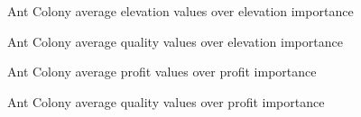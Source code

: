 \begin{figure}[H]
	\centering
	
	\caption{Ant Colony average elevation values over elevation importance}
	\label{fig:AntColonyElevationAvg}
\end{figure}




\begin{figure}[H]
	\centering
	
	\caption{Ant Colony average quality values over elevation importance}
	\label{fig:AntColonyQualityElevationAvg}
\end{figure}







\begin{figure}[H]
	\centering
	
	\caption{Ant Colony average profit values over profit importance}
	\label{fig:AntColonyProfitAvg}
\end{figure}



\begin{figure}[H]
	\centering
	
	\caption{Ant Colony average quality values over profit importance}
	\label{fig:AntColonyQualityProfitAvg}
\end{figure}






